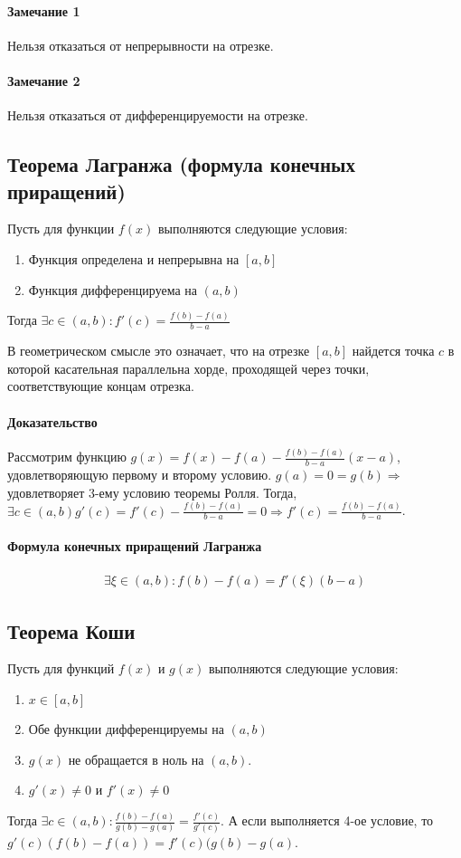\documentclass[10pt]{article}
\begin{document}
				\paragraph{Замечание 1}
					Нельзя отказаться от непрерывности на отрезке.
				\paragraph{Замечание 2}
					Нельзя отказаться от дифференцируемости на отрезке.
			\subsection{Теорема Лагранжа (формула конечных приращений)}
				Пусть для функции $f(x)$ выполняются следующие условия: 
				\begin{enumerate}
					\item Функция определена и непрерывна на $[a, b]$
					\item Функция дифференцируема на $(a, b)$
				\end{enumerate}
				Тогда $\exists c \in (a, b) : f'(c) = \frac{f(b) - f(a)}{b-a}$
				
				В геометрическом смысле это означает, что на отрезке $[a, b]$ найдется точка $c$ в которой касательная параллельна хорде, проходящей через точки, соответствующие концам отрезка.
				\paragraph{Доказательство}
					Рассмотрим функцию $g(x) = f(x) - f(a) - \frac{f(b)-f(a)}{b-a}(x - a)$, удовлетворяющую первому и второму условию. $g(a) = 0 = g(b) \Rightarrow$ удовлетворяет 3-ему условию теоремы Ролля. Тогда, $\exists c \in (a, b) g'(c) = f'(c) - \frac{f(b)-f(a)}{b-a} = 0 \Rightarrow f'(c) = \frac{f(b)-f(a)}{b-a}$.
					
				\paragraph{Формула конечных приращений Лагранжа}
					\begin{eqnarray}
						\exists \xi \in (a, b) : f(b) - f(a) = f'(\xi)(b-a)	
					\end{eqnarray}
			\subsection{Теорема Коши}
				Пусть для функций $f(x)$ и $g(x)$ выполняются следующие условия:
				\begin{enumerate}
					\item $x \in [a, b]$
					\item Обе функции дифференцируемы на $(a, b)$
					\item $g(x)$ не обращается в ноль на $(a, b)$.
					\item $g'(x) \neq 0$ и $f'(x) \neq 0$
				\end{enumerate}
				Тогда $\exists c \in (a, b) : \frac{f(b) - f(a)}{g(b) - g(a)} = \frac{f'(c)}{g'(c)}$.
				А если выполняется 4-ое условие, то $g'(c)(f(b) - f(a)) = f'(c)(g(b) - g(a)$.
				
\end{document}
